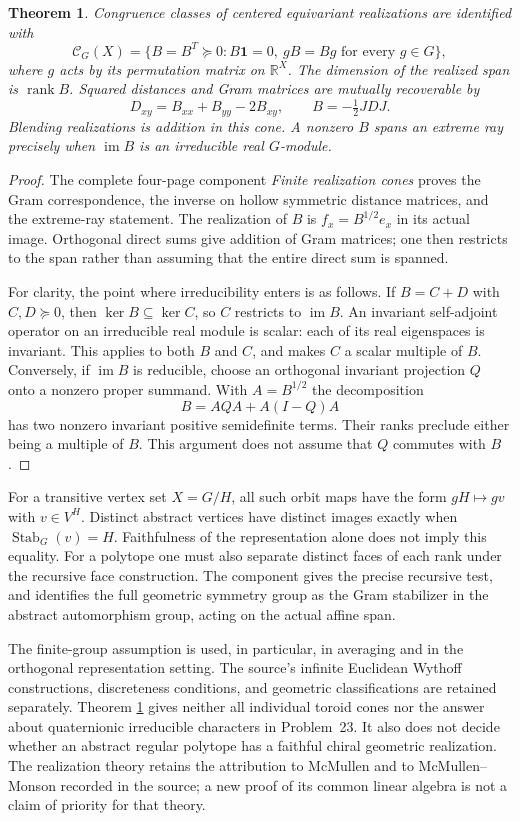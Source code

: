 \documentclass[11pt,a4paper]{article}
\newtheorem{theorem}{Theorem}
\newcommand{\im}{\operatorname{im}}
\newcommand{\R}{\mathbb R}
\begin{document}
\begin{theorem}\label{cone}
Congruence classes of centered equivariant realizations are
identified with
\[
 \mathcal C_G(X)=\{B=B^T\succeq0:B\mathbf1=0,\ gB=Bg
                         \text{ for every }g\in G\},
\]
where $g$ acts by its permutation matrix on $\R^X$.
The dimension of the realized span is $\operatorname{rank}B$.
Squared distances and Gram matrices are mutually recoverable by
\[
 D_{xy}=B_{xx}+B_{yy}-2B_{xy},\qquad B=-\tfrac12 JDJ.
\]
Blending realizations is addition in this cone. A nonzero
$B$ spans an extreme ray precisely when $\im B$ is an
irreducible real $G$-module.
\end{theorem}
\begin{proof}
The complete four-page component \emph{Finite realization cones}
proves the Gram correspondence, the inverse on hollow symmetric
distance matrices, and the extreme-ray statement. The realization
of $B$ is $f_x=B^{1/2}e_x$ in its actual image. Orthogonal
direct sums give addition of Gram matrices; one then restricts
to the span rather than assuming that the entire direct sum
is spanned.

For clarity, the point where irreducibility enters is as follows.
If $B=C+D$ with $C,D\succeq0$, then $\ker B\subseteq\ker C$,
so $C$ restricts to $\im B$. An invariant self-adjoint
operator on an irreducible real module is scalar: each of
its real eigenspaces is invariant. This applies to both $B$
and $C$, and makes $C$ a scalar multiple of $B$. Conversely,
if $\im B$ is reducible, choose an orthogonal invariant
projection $Q$ onto a nonzero proper summand. With
$A=B^{1/2}$ the decomposition
\[
                    B=AQA+A(I-Q)A
\]
has two nonzero invariant positive semidefinite terms.
Their ranks preclude either being a multiple of $B$.
This argument does not assume that $Q$ commutes with $B$.
\end{proof}

For a transitive vertex set $X=G/H$, all such orbit maps have
the form $gH\mapsto gv$ with $v\in V^H$. Distinct abstract
vertices have distinct images exactly when
$\operatorname{Stab}_G(v)=H$. Faithfulness of the representation
alone does not imply this equality. For a polytope one must also
separate distinct faces of each rank under the recursive face
construction. The component gives the precise recursive test,
and identifies the full geometric symmetry group as the Gram
stabilizer in the abstract automorphism group, acting on the
actual affine span.

The finite-group assumption is used, in particular, in averaging
and in the orthogonal representation setting. The source's
infinite Euclidean Wythoff constructions, discreteness conditions,
and geometric classifications are retained separately. Theorem
\ref{cone} gives neither all individual toroid cones nor the
answer about quaternionic irreducible characters in Problem~23.
It also does not decide whether an abstract regular polytope
has a faithful chiral geometric realization. The realization
theory retains the attribution to McMullen and to
McMullen--Monson recorded in the source; a new proof of its
common linear algebra is not a claim of priority for that theory.
\end{document}
